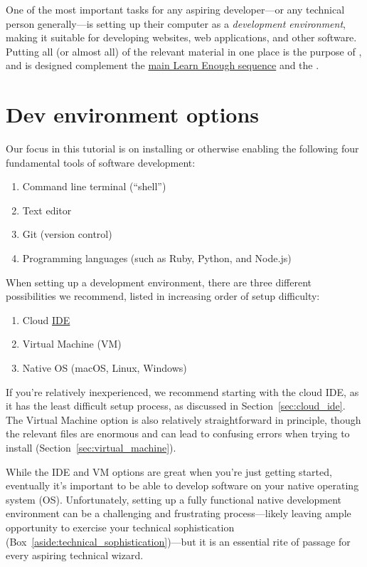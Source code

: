 One of the most important tasks for any aspiring developer---or any technical person generally---is setting up their computer as a \emph{development environment}, making it suitable for developing websites, web applications, and other software. Putting all (or almost all) of the relevant material in one place is the purpose of \ledev, and is designed complement the \href{#}{main Learn Enough sequence} and the \rort.

\section{Dev environment options} %
\label{sec:dev_environment_options}

Our focus in this tutorial is on installing or otherwise enabling the following four fundamental tools of software development:

\begin{enumerate}
  \item Command line terminal (``shell'')
  \item Text editor
  \item Git (version control)
  \item Programming languages (such as Ruby, Python, and Node.js)
\end{enumerate}

When setting up a development environment, there are three different possibilities we recommend, listed in increasing order of setup difficulty:

\begin{enumerate}
  \item Cloud \href{https://en.wikipedia.org/wiki/Integrated_development_environment}{IDE}
  \item Virtual Machine (VM)
  \item Native OS (macOS, Linux, Windows)
\end{enumerate}

If you're relatively inexperienced, we recommend starting with the cloud IDE, as it has the least difficult setup process, as discussed in Section~\ref{sec:cloud_ide}. The Virtual Machine option is also relatively straightforward in principle, though the relevant files are enormous and can lead to confusing errors when trying to install (Section~\ref{sec:virtual_machine}).

While the IDE and VM options are great when you're just getting started, eventually it's important to be able to develop software on your native operating system (OS). Unfortunately, setting up a fully functional native development environment can be a challenging and frustrating process---likely leaving ample opportunity to exercise your technical sophistication (Box~\ref{aside:technical_sophistication})---but it is an essential rite of passage for every aspiring technical wizard.

